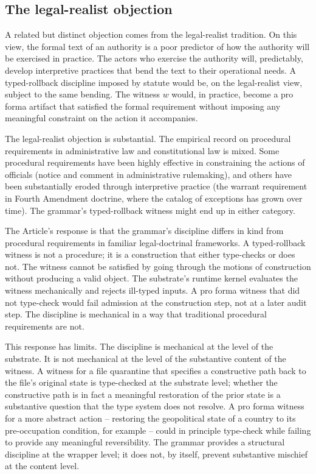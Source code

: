 \subsection{The legal-realist objection}

A related but distinct objection comes from the legal-realist tradition.
On this view, the formal text of an authority is a poor predictor of how the authority will be exercised in practice.
The actors who exercise the authority will, predictably, develop interpretive practices that bend the text to
their operational needs.
A typed-rollback discipline imposed by statute would be, on the legal-realist view, subject to the same bending.
The witness $w$ would, in practice, become a pro forma artifact that satisfied the formal requirement without
imposing any meaningful constraint on the action it accompanies.

The legal-realist objection is substantial.
The empirical record on procedural requirements in administrative law and constitutional law is mixed.
Some procedural requirements have been highly effective in constraining the actions of officials
(notice and comment in administrative rulemaking),
and others have been substantially eroded through interpretive practice
(the warrant requirement in Fourth Amendment doctrine, where the catalog of exceptions has grown over time).
The grammar's typed-rollback witness might end up in either category.

The Article's response is that the grammar's discipline differs in kind from procedural requirements in
familiar legal-doctrinal frameworks.
A typed-rollback witness is not a procedure;
it is a construction that either type-checks or does not.
The witness cannot be satisfied by going through the motions of construction without producing a valid object.
The substrate's runtime kernel evaluates the witness mechanically and rejects ill-typed inputs.
A pro forma witness that did not type-check would fail admission at the construction step,
not at a later audit step.
The discipline is mechanical in a way that traditional procedural requirements are not.

This response has limits.
The discipline is mechanical at the level of the substrate.
It is not mechanical at the level of the substantive content of the witness.
A witness for a file quarantine that specifies a constructive path back to the file's original state is type-checked
at the substrate level;
whether the constructive path is in fact a meaningful restoration of the prior state is a substantive question
that the type system does not resolve.
A pro forma witness for a more abstract action -- restoring the geopolitical state of a country to its
pre-occupation condition, for example -- could in principle type-check while failing to provide any meaningful
reversibility.
The grammar provides a structural discipline at the wrapper level;
it does not, by itself, prevent substantive mischief at the content level.

